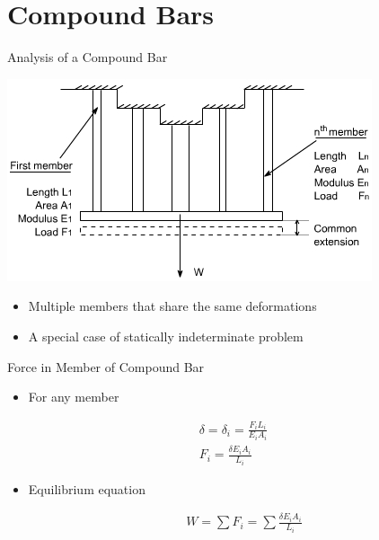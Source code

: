 \documentclass[10pt, svgnames]{beamer}
\begin{document}
\section{Compound Bars}
\label{compound-bars}
\begin{frame}[label={sec:org537c648}]{Analysis of a Compound Bar}
\begin{center}
\includegraphics[width=.9\linewidth]{pictures/compound-bar.jpg}
\end{center}

\begin{itemize}
\item Multiple members that share the same deformations

\item A special case of statically indeterminate problem
\end{itemize}
\end{frame}

\begin{frame}[label={sec:org84c802a}]{Force in Member of Compound Bar}
\begin{itemize}
\item For any member
\end{itemize}

\begin{align*}
  \delta = \delta_i = \frac{F_i L_i}{E_i A_i} \\
  F_i = \frac{\delta E_i A_i}{L_i}
\end{align*}

\begin{itemize}
\item Equilibrium equation

\begin{align*}
  W = \sum F_i = \sum \frac{\delta E_i A_i}{L_i}
\end{align*}
\end{itemize}
\end{frame}
\end{document}

